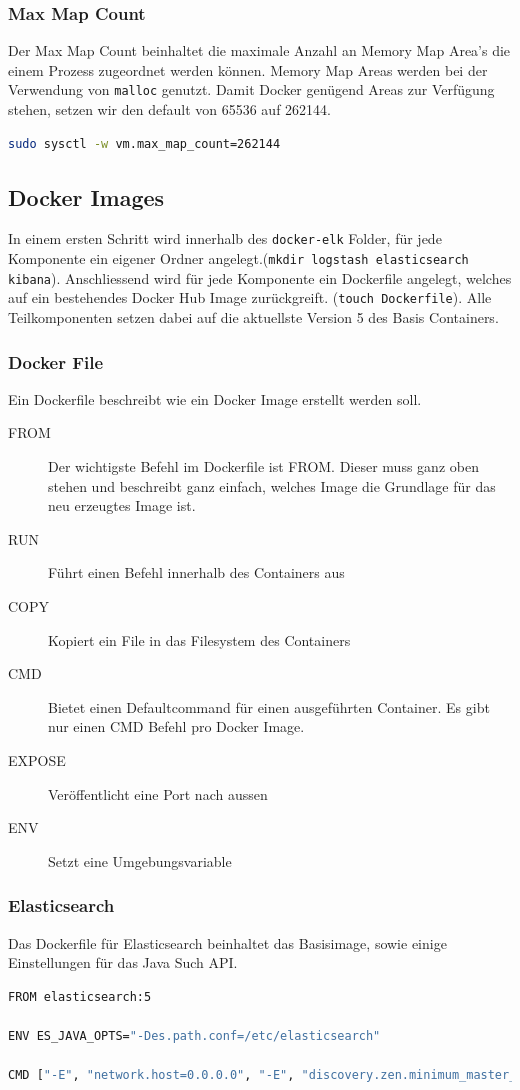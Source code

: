 \subsubsection{Max Map Count}
Der Max Map Count beinhaltet die maximale Anzahl an Memory Map Area's die einem Prozess zugeordnet werden können. Memory Map Areas werden bei der Verwendung von \lstinline[]|malloc| genutzt. Damit Docker genügend Areas zur Verfügung stehen, setzen wir den default von 65536 auf 262144.
\begin{lstlisting}[language=bash]
sudo sysctl -w vm.max_map_count=262144
\end{lstlisting}

\subsection{Docker Images}
In einem ersten Schritt wird innerhalb des \lstinline[]|docker-elk| Folder, für jede Komponente ein eigener Ordner angelegt.(\lstinline[]|mkdir logstash elasticsearch kibana|). Anschliessend wird für jede Komponente ein Dockerfile angelegt, welches auf ein bestehendes Docker Hub Image zurückgreift. (\lstinline[]|touch Dockerfile|). Alle Teilkomponenten setzen dabei auf die aktuellste Version 5 des Basis Containers.

\subsubsection{Docker File}
Ein Dockerfile beschreibt wie ein Docker Image erstellt werden soll. 
\begin{description}
	\item[FROM] Der wichtigste Befehl im Dockerfile ist FROM. Dieser muss ganz oben stehen und beschreibt ganz einfach, welches Image die Grundlage für das neu erzeugtes Image ist.	
	\item[RUN] Führt einen Befehl innerhalb des Containers aus
	\item[COPY] Kopiert ein File in das Filesystem des Containers
	\item[CMD] Bietet einen Defaultcommand für einen ausgeführten Container. Es gibt nur einen CMD Befehl pro Docker Image.
	\item[EXPOSE] Veröffentlicht eine Port nach aussen
	\item[ENV] Setzt eine Umgebungsvariable
\end{description}

\subsubsection{Elasticsearch}
Das Dockerfile für Elasticsearch beinhaltet das Basisimage, sowie einige Einstellungen für das Java Such API.
\begin{lstlisting}[caption=Elasticsearch Dockerfile, language=bash]
FROM elasticsearch:5

ENV ES_JAVA_OPTS="-Des.path.conf=/etc/elasticsearch"

CMD ["-E", "network.host=0.0.0.0", "-E", "discovery.zen.minimum_master_nodes=1"]
\end{lstlisting}

